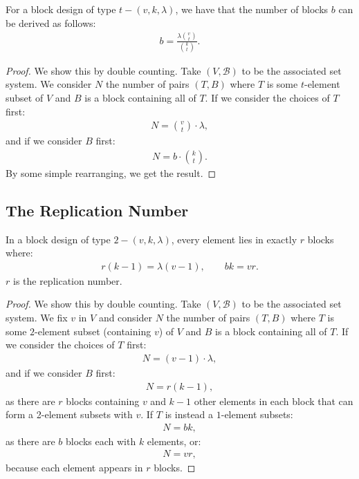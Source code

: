 For a block design of type $t-(v,k,\lambda)$, we have that the number
of blocks $b$ can be derived as follows: \begin{gather*}
  b = \frac{\lambda\binom{v}{t}}{\binom{k}{t}}.
\end{gather*}
\begin{proof}
    We show this by double counting. Take $(V, \mathcal{B})$ to be the
    associated set system. We consider $N$ the number of pairs
    $(T, B)$ where $T$ is some $t$-element subset of $V$ and $B$
    is a block containing all of $T$. 
    \newpage \noindent
    If we consider the choices of
    $T$ first: \begin{gather*}
        N = \binom{v}{t} \cdot \lambda,
    \end{gather*} and if we consider $B$ first: \begin{gather*}
        N = b \cdot \binom{k}{t}.
    \end{gather*} By some simple rearranging, we get the result.
\end{proof}

\subsection{The Replication Number}

In a block design of type $2-(v,k,\lambda)$, every element lies in
exactly $r$ blocks where: \begin{gather*}
  r(k - 1) = \lambda(v - 1), \qquad bk = vr.
\end{gather*} $r$ is the replication number.
\begin{proof}
    We show this by double counting. Take $(V, \mathcal{B})$ to be the
    associated set system. We fix $v$ in $V$ and consider $N$ the number 
    of pairs $(T, B)$ where $T$ is some $2$-element subset (containing $v$) 
    of $V$ and $B$ is a block containing all of $T$. If we consider the 
    choices of $T$ first: \begin{gather*}
        N = (v - 1) \cdot \lambda,
    \end{gather*} and if we consider $B$ first: \begin{gather*}
        N = r(k - 1),
    \end{gather*} as there are $r$ blocks containing $v$ and $k - 1$
    other elements in each block that can form a 2-element subsets
    with $v$. If $T$ is instead a $1$-element subsets: \begin{gather*}
        N = bk,
    \end{gather*} as there are $b$ blocks each with $k$ elements, or: \begin{gather*}
        N = vr, 
    \end{gather*} because each element appears in $r$ blocks.
\end{proof}

